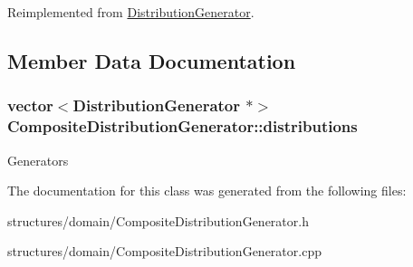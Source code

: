 Reimplemented from \hyperlink{class_distribution_generator_ae4fa2d599942539e4b1971b0a8d5f8ba}{Distribution\+Generator}.



\subsection{Member Data Documentation}
\subsubsection[{\texorpdfstring{distributions}{distributions}}]{\setlength{\rightskip}{0pt plus 5cm}vector$<${\bf Distribution\+Generator} $\ast$$>$ Composite\+Distribution\+Generator\+::distributions\hspace{0.3cm}{\ttfamily [private]}}\hypertarget{class_composite_distribution_generator_a9f89632c997c30324e4652ea8bc6d761}{}\label{class_composite_distribution_generator_a9f89632c997c30324e4652ea8bc6d761}
Generators 

The documentation for this class was generated from the following files\+:\begin{DoxyCompactItemize}
\item 
structures/domain/Composite\+Distribution\+Generator.\+h\item 
structures/domain/Composite\+Distribution\+Generator.\+cpp\end{DoxyCompactItemize}
